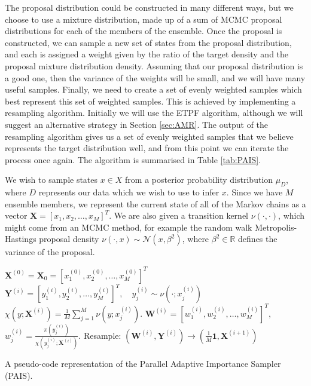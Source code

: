 \documentclass[final]{siamltex}
\newcommand{\X}{{\mathbf X}}
\newcommand{\Y}{{\mathbf Y}}
\newcommand{\W}{{\mathbf W}}
\begin{document}
The proposal distribution could be constructed in many different ways,
but we choose to use a mixture distribution, made up of a sum of MCMC
proposal distributions for each of the members of the ensemble. Once the proposal is
constructed, we can sample a new set of states from the proposal
distribution, and each is assigned a weight given by the ratio of the target
density and the proposal mixture distribution density. Assuming that
our proposal distribution is a good one, then the variance of the
weights will be small, and we will have many useful samples. Finally, we
need to create a set of evenly weighted samples which best represent
this set of weighted samples. This is achieved by implementing a
resampling algorithm. Initially we will use the
ETPF algorithm\cite{reich2013nonparametric}, although we will suggest an alternative strategy in
Section \ref{sec:AMR}. The output of the resampling algorithm gives us
a set of evenly weighted
samples that we believe represents the target distribution well, and
from this point we
can iterate the process once again. The algorithm is summarised in Table \ref{tab:PAIS}. 

We wish to sample states $x \in X$ from a posterior
probability distribution $\mu_D$, where $D$ represents our data which
we wish to use to infer $x$. Since we have $M$ ensemble members, we
represent the current state of all of the Markov chains as a vector
$\X = [x_1,x_2,\ldots,x_M]^T$. We are also given a transition kernel
$\nu(\cdot,\cdot)$, which might come from an MCMC method, for example
the random walk Metropolis-Hastings proposal density $\nu(\cdot,x) \sim
\mathcal{N}(x,\beta^2)$, where $\beta^2\in \mathbb{R}$ defines the
variance of the proposal.

\begin{table}
\begin{mdframed}
\begin{algorithmic}
\STATE $\X^{(0)} = \X_0 = [x_1^{(0)},x_2^{(0)},\ldots,x_M^{(0)}]^T$
\STATE $\Y^{(i)} = [y_1^{(i)},y_2^{(i)},\ldots,y_M^{(i)}]^T, \quad y_j^{(i)} \sim
\nu(\cdot;x_j^{(i)})$
\STATE $\chi(y;\X^{(i)}) = \frac{1}{M}
\sum_{j=1}^M \nu(y;x_j^{(i)})$.
\STATE $\W^{(i)} = [w_1^{(i)},w_2^{(i)},\ldots,w_M^{(i)}]^T,$ \quad $w^{(i)}_j =
\frac{\pi(y_j^{(i)})}{\chi(y_j^{(i)};\X^{(i)})}$.
\STATE Resample: $(\W^{(i)},\Y^{(i)}) \rightarrow (\frac{1}{M}\mathbf{1}, \X^{(i+1)})$
\ENDFOR 
\end{algorithmic}
\end{mdframed}

\caption{A pseudo-code representation of the Parallel Adaptive
  Importance Sampler (PAIS).}
\label{tab:PAIS}
\end{table}
\end{document}
